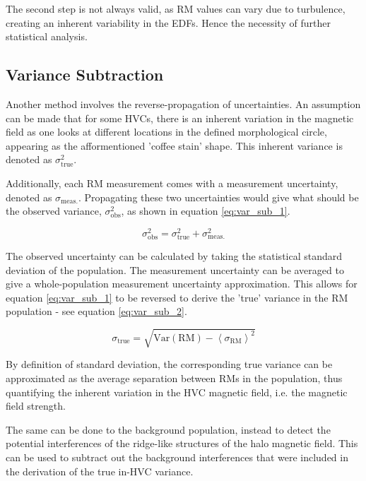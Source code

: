 The second step is not always valid, as RM values can vary due to turbulence, creating an inherent variability in the EDFs. Hence the necessity of further statistical analysis.


\subsection{Variance Subtraction}
\label{ssec:sigma_sub}

Another method involves the reverse-propagation of uncertainties. An assumption can be made that for some HVCs, there is an inherent variation in the magnetic field as one looks at different locations in the defined morphological circle, appearing as the afformentioned 'coffee stain' shape. This inherent variance is denoted as $\sigma_{\mathrm{true}}^2$.


Additionally, each RM measurement comes with a measurement uncertainty, denoted as $\sigma_{\mathrm{meas.}}$. Propagating these two uncertainties would give what should be the observed variance, $\sigma_{\mathrm{obs}}^2$, as shown in equation \ref{eq:var_sub_1}.


\begin{equation}
    \sigma_{\mathrm{obs}}^2 = \sigma_{\mathrm{true}}^2 + \sigma_{\mathrm{meas.}}^2
\label{eq:var_sub_1}
\end{equation}


The observed uncertainty can be calculated by taking the statistical standard deviation of the population. The measurement uncertainty can be averaged to give a whole-population measurement uncertainty approximation. This allows for equation \ref{eq:var_sub_1} to be reversed to derive the 'true' variance in the RM population - see equation \ref{eq:var_sub_2}.


\begin{equation}
    \sigma_{\mathrm{true}} = \sqrt{\mathrm{Var}\left(\mathrm{RM}\right) - {\left<\sigma_{\mathrm{RM}}\right>}^2}
\label{eq:var_sub_2}
\end{equation}


By definition of standard deviation, the corresponding true variance can be approximated as the average separation between RMs in the population, thus quantifying the inherent variation in the HVC magnetic field, i.e. the magnetic field strength.


The same can be done to the background population, instead to detect the potential interferences of the ridge-like structures of the halo magnetic field. This can be used to subtract out the background interferences that were included in the derivation of the true in-HVC variance.


